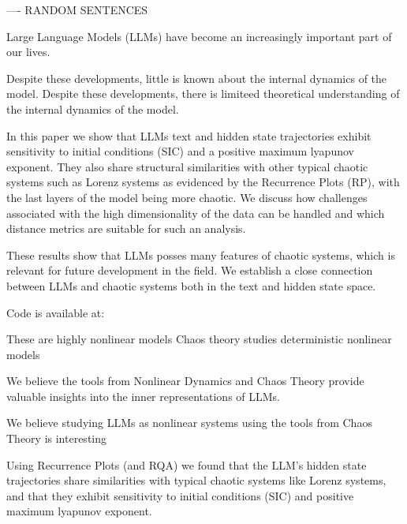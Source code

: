 ---- RANDOM SENTENCES

Large Language Models (LLMs) have become an increasingly important part of our lives.

Despite these developments, little is known about the internal dynamics of the model.
Despite these developments, there is limiteed theoretical understanding of the internal dynamics of the model.




In this paper we show that LLMs text and hidden state trajectories exhibit sensitivity to initial conditions (SIC) and a positive maximum lyapunov exponent. They also share structural similarities with other typical chaotic systems such as Lorenz systems as evidenced by the Recurrence Plots (RP), with the last layers of the model being more chaotic. We discuss how challenges associated with the high dimensionality of the data can be handled and which distance metrics are suitable for such an analysis.

These results show that LLMs posses many features of chaotic systems, which is relevant for future development in the field.
We establish a close connection between LLMs and chaotic systems both in the text and hidden state space.


Code is available at: 



These are highly nonlinear models
Chaos theory studies deterministic nonlinear models

We believe the tools from Nonlinear Dynamics and Chaos Theory provide valuable insights into the inner representations of LLMs.

We believe studying LLMs as nonlinear systems using the tools from Chaos Theory is interesting





Using Recurrence Plots (and RQA) we found that the LLM's hidden state trajectories share similarities with typical chaotic systems like Lorenz systems, and that they exhibit sensitivity to initial conditions (SIC) and positive maximum lyapunov exponent.











